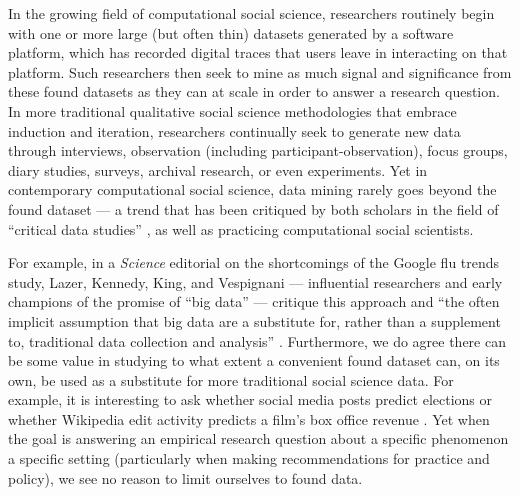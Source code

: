 \documentclass[format=acmsmall, review=false, screen=true]{acmart}%
\begin{document}
In the growing field of computational social science, researchers routinely begin with one or more large (but often thin) datasets generated by a software platform, which has recorded digital traces that users leave in interacting on that platform. Such researchers then seek to mine as much signal and significance from these found datasets as they can at scale in order to answer a research question. In more traditional qualitative social science methodologies that embrace induction and iteration, researchers continually seek to generate new data through interviews, observation (including participant-observation), focus groups, diary studies, surveys, archival research, or even experiments. Yet in contemporary computational social science, data mining rarely goes beyond the found dataset --- a trend that has been critiqued by both scholars in the field of ``critical data studies'' \cite{Iliadis2016,boyd2012}, as well as practicing computational social scientists. 

For example, in a \textit{Science} editorial on the shortcomings of the Google flu trends study, Lazer, Kennedy, King, and Vespignani --- influential researchers and early champions of the promise of ``big data'' --- critique this approach and ``the often implicit assumption that big data are a substitute for, rather than a supplement to, traditional data collection and analysis'' \cite{Lazer2014}.  Furthermore, we do agree there can be some value in studying to what extent a convenient found dataset can, on its own, be used as a substitute for more traditional social science data. For example, it is interesting to ask whether social media posts predict elections \cite{metaxas2011} or whether Wikipedia edit activity predicts a film's box office revenue \cite{Mestyan2013}. Yet when the goal is answering an empirical research question about a specific phenomenon a specific setting (particularly when making recommendations for practice and policy), we see no reason to limit ourselves to found data.
\end{document}
